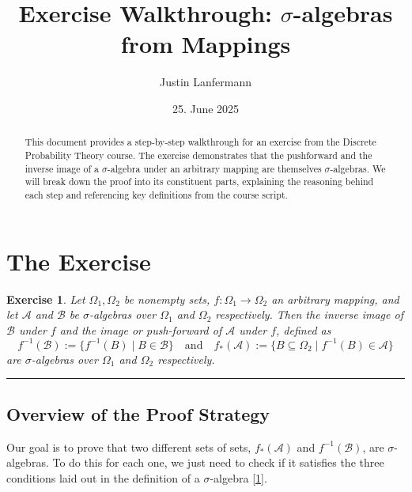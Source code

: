 \documentclass[11pt,a4paper]{article}
\title{Exercise Walkthrough: \(\sigma\)-algebras from Mappings}
\author{Justin Lanfermann}
\date{25. June 2025}
\newtheorem{exercise}{Exercise}
\begin{document}
\maketitle

\begin{abstract}
    This document provides a step-by-step walkthrough for an exercise from the Discrete Probability Theory course. The exercise demonstrates that the pushforward and the inverse image of a \(\sigma\)-algebra under an arbitrary mapping are themselves \(\sigma\)-algebras. We will break down the proof into its constituent parts, explaining the reasoning behind each step and referencing key definitions from the course script.
\end{abstract}

\section{The Exercise}

\begin{exercise}
Let \(\Omega_1, \Omega_2\) be nonempty sets, \(f : \Omega_1 \to \Omega_2\) an arbitrary mapping, and let \(\mathcal{A}\) and \(\mathcal{B}\) be \(\sigma\)-algebras over \(\Omega_1\) and \(\Omega_2\) respectively. Then the inverse image of \(\mathcal{B}\) under \(f\) and the image or push-forward of \(\mathcal{A}\) under \(f\), defined as
\[ f^{-1}(\mathcal{B}) := \{f^{-1}(B) \mid B \in \mathcal{B}\} \quad \text{and} \quad f_*(\mathcal{A}) := \{B \subseteq \Omega_2 \mid f^{-1}(B) \in \mathcal{A}\} \]
are \(\sigma\)-algebras over \(\Omega_1\) and \(\Omega_2\) respectively.
\end{exercise}

\hrule
\vspace{1em}

\subsection*{Overview of the Proof Strategy}
Our goal is to prove that two different sets of sets, \(f_*(\mathcal{A})\) and \(f^{-1}(\mathcal{B})\), are \(\sigma\)-algebras. To do this for each one, we just need to check if it satisfies the three conditions laid out in the definition of a \(\sigma\)-algebra \hyperlink{def:sigma-algebra}{[1]}.
\end{document}
